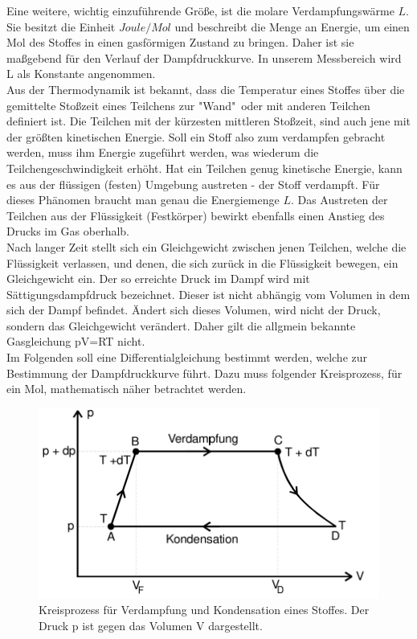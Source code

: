 \noindent
Eine weitere, wichtig einzuführende Größe, ist die molare Verdampfungswärme $L$. Sie besitzt die Einheit $\unit{Joule/Mol}$ und beschreibt die Menge an Energie, um einen Mol
des Stoffes in einen gasförmigen Zustand zu bringen. Daher ist sie maßgebend für den Verlauf der Dampfdruckkurve. In unserem Messbereich
wird L als Konstante angenommen.\\
Aus der Thermodynamik ist bekannt, dass die Temperatur eines Stoffes über die gemittelte Stoßzeit eines Teilchens zur "Wand"\, oder mit anderen Teilchen definiert ist. Die Teilchen
mit der kürzesten mittleren Stoßzeit, sind auch jene mit der größten kinetischen Energie. Soll ein Stoff also zum verdampfen gebracht werden, muss ihm Energie zugeführt werden,
was wiederum die Teilchengeschwindigkeit erhöht. Hat ein Teilchen genug kinetische Energie, kann es aus der flüssigen (festen) Umgebung austreten - der Stoff verdampft. Für dieses Phänomen
braucht man genau die Energiemenge $L$. Das Austreten der Teilchen aus der Flüssigkeit (Festkörper) bewirkt ebenfalls einen Anstieg des Drucks im Gas oberhalb.\\
Nach langer Zeit stellt sich ein Gleichgewicht zwischen jenen Teilchen, welche die Flüssigkeit verlassen, und denen, die sich zurück in die Flüssigkeit bewegen, ein Gleichgewicht ein. Der so erreichte Druck im Dampf
wird mit Sättigungsdampfdruck bezeichnet. Dieser ist nicht abhängig vom Volumen in dem sich der Dampf befindet. Ändert sich dieses Volumen, wird nicht der Druck, sondern das Gleichgewicht verändert. Daher gilt die allgmein bekannte Gasgleichung
pV=RT nicht.\\
Im Folgenden soll eine Differentialgleichung bestimmt werden, welche zur Bestimmung der Dampfdruckkurve führt.
Dazu muss folgender Kreisprozess, für ein Mol, mathematisch näher betrachtet werden.
\begin{figure}[h!]
    \centering
    \includegraphics[scale=0.8]{sreen2.jpg}
    \caption{Kreisprozess für Verdampfung und Kondensation eines Stoffes. Der Druck p ist
    gegen das Volumen V dargestellt.}
    \label{Abb2:Kreisprozess}
\end{figure}

